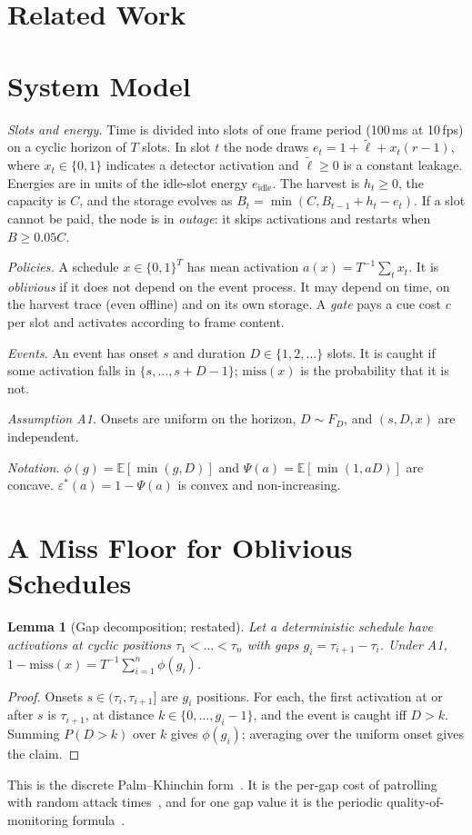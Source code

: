 \documentclass[final,5p,times,twocolumn]{elsarticle}
\newtheorem{lemma}{Lemma}
\theoremstyle{definition}
\theoremstyle{remark}
\newcommand{\eps}{\varepsilon}
\newcommand{\Psif}{\Psi}
\newcommand{\lt}{\tilde{\ell}}
\newcommand{\E}{\mathbb{E}}
\begin{document}
\section{Related Work}\label{sec:related}


\section{System Model}\label{sec:model}
\emph{Slots and energy.} Time is divided into slots of one frame period (100\,ms at 10\,fps) on a cyclic horizon of $T$ slots. In slot $t$ the node draws $e_t=1+\lt+x_t(r-1)$, where $x_t\in\{0,1\}$ indicates a detector activation and $\lt\ge0$ is a constant leakage. Energies are in units of the idle-slot energy $e_{\mathrm{idle}}$. The harvest is $h_t\ge0$, the capacity is $C$, and the storage evolves as $B_t=\min(C,B_{t-1}+h_t-e_t)$. If a slot cannot be paid, the node is in \emph{outage}: it skips activations and restarts when $B\ge0.05C$.

\emph{Policies.} A schedule $x\in\{0,1\}^T$ has mean activation $a(x)=T^{-1}\sum_t x_t$. It is \emph{oblivious} if it does not depend on the event process. It may depend on time, on the harvest trace (even offline) and on its own storage. A \emph{gate} pays a cue cost $c$ per slot and activates according to frame content.

\emph{Events.} An event has onset $s$ and duration $D\in\{1,2,\dots\}$ slots. It is caught if some activation falls in $\{s,\dots,s+D-1\}$; $\mathrm{miss}(x)$ is the probability that it is not.

\emph{Assumption A1.} Onsets are uniform on the horizon, $D\sim F_D$, and $(s,D,x)$ are independent.

\emph{Notation.} $\phi(g)=\E[\min(g,D)]$ and $\Psif(a)=\E[\min(1,aD)]$ are concave. $\eps^*(a)=1-\Psif(a)$ is convex and non-increasing.

\section{A Miss Floor for Oblivious Schedules}\label{sec:floor}
\begin{lemma}[Gap decomposition; restated]\label{lem:gap}
Let a deterministic schedule have activations at cyclic positions $\tau_1<\dots<\tau_n$ with gaps $g_i=\tau_{i+1}-\tau_i$. Under A1, $1-\mathrm{miss}(x)=T^{-1}\sum_{i=1}^n\phi(g_i)$.
\end{lemma}
\begin{proof}
Onsets $s\in(\tau_i,\tau_{i+1}]$ are $g_i$ positions. For each, the first activation at or after $s$ is $\tau_{i+1}$, at distance $k\in\{0,\dots,g_i-1\}$, and the event is caught iff $D>k$. Summing $P(D>k)$ over $k$ gives $\phi(g_i)$; averaging over the uniform onset gives the claim.
\end{proof}
\noindent This is the discrete Palm--Khinchin form~\cite{daley2003pp1}. It is the per-gap cost of patrolling with random attack times~\cite{lin2013opre}, and for one gap value it is the periodic quality-of-monitoring formula~\cite[Thm.~4.2]{yau2010tosn}.
\end{document}
